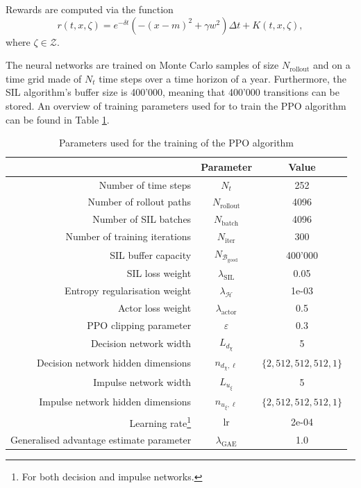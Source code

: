 Rewards are computed via the function
\begin{equation*}
    r(t,x,\zeta) = e^{-\delta t} \left(-(x-m)^2 + \gamma w^2 \right) \Delta t + K(t,x,\zeta),
\end{equation*}
where $\zeta \in \mathcal Z$.

The neural networks are trained on Monte Carlo samples of size $N_{\text{rollout}}$ and on a time grid made of $N_t$ time steps over a time horizon of a year. Furthermore, the SIL algorithm's buffer size is 400'000, meaning that 400'000 transitions can be stored. An overview of training parameters used for to train the PPO algorithm can be found in Table \ref{tab: PPO training parameters}.

\begin{table}[h]
    \centering
    \begin{tabular}{rcc}
        \toprule
        & Parameter & Value \\
        \hline
        Number of time steps & $N_t$ & 252 \\
        Number of rollout paths & $N_\text{rollout}$ & 4096 \\
        Number of SIL batches & $N_\text{batch}$ & 4096 \\
        Number of training iterations & $N_\text{iter}$ & 300 \\
        SIL buffer capacity & $N_{\mathcal{B}_\text{good}}$ & 400'000 \\
        SIL loss weight & $\lambda_{\text{SIL}}$ & 0.05 \\
        Entropy regularisation weight & $\lambda_{\mathcal{H}}$ & 1e-03 \\
        Actor loss weight & $\lambda_{\text{actor}}$ & 0.5 \\
        PPO clipping parameter & $\varepsilon$ & 0.3 \\
        Decision network width & $L_{d_\chi}$ & 5 \\
        Decision network hidden dimensions & $n_{d_\chi, \ell}$ & $\{2,512, 512, 512,1\}$ \\
        Impulse network width & $L_{u_\xi}$ & 5 \\
        Impulse network hidden dimensions & $n_{u_\xi, \ell}$ & $\{2,512, 512, 512,1\}$ \\
        Learning rate\footnote{For both decision and impulse networks.} & lr & 2e-04 \\
        Generalised advantage estimate parameter & $\lambda_\text{GAE}$ & 1.0\\
        \toprule
    \end{tabular}
    \caption{Parameters used for the training of the PPO algorithm}
    \label{tab: PPO training parameters}
\end{table}

